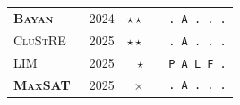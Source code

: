 \documentclass[../paper.tex]{subfiles}
\begin{document}
\begin{table}
\begin{tabular}{lrrlp{2cm}}
        \textbf{\textsc{Bayan}}~\cite{bayan2024}   & 2024 & $\star\star$ & \cite{bayanRepo}     & \texttt{. A . . .}  \\
        \textsc{CluStRE}~\cite{clustre2025}        & 2025 & $\star\star$ & \cite{clustreRepo}   & \texttt{. A . . .}  \\
        \textsc{LIM}~\cite{lim2025}                & 2025 & $\star$      & \cite{limRepo}       & \texttt{P A L F .}  \\
        \textbf{\textsc{MaxSAT}}~\cite{maxsat2025} & 2025 & $\times$     &                      & \texttt{. A . . .}  \\
        \bottomrule
    \end{tabular}
\end{table}

\ifSubfilesClassLoaded{%
}{}
\end{document}
